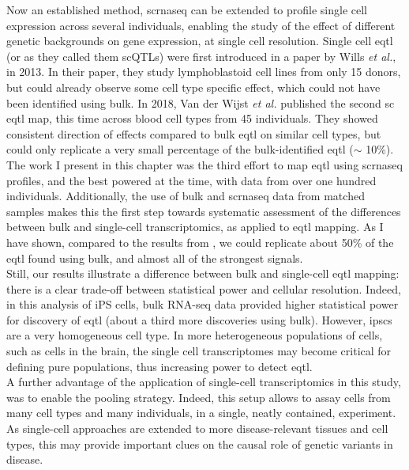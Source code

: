 Now an established method, \gls{scrnaseq} can be extended to profile single cell expression across several individuals, enabling the study of the effect of different genetic backgrounds on gene expression, at single cell resolution.
Single cell \gls{eqtl} (or as they called them scQTLs) were first introduced in a paper by Wills \textit{et al.}, in 2013.
In their paper, they study lymphoblastoid cell lines from only 15 donors, but could already observe some cell type specific effect, which could not have been identified using bulk.
In 2018, Van der Wijst \textit{et al.} \cite{van2018single} published the second sc \gls{eqtl} map, this time across blood cell types from 45 individuals.
They showed consistent direction of effects compared to bulk \gls{eqtl} on similar cell types, but could only replicate a very small percentage of the bulk-identified \gls{eqtl} ($\sim$ 10\%). \\

The work I present in this chapter was the third effort to map \gls{eqtl} using \gls{scrnaseq} profiles, and the best powered at the time, with data from over one hundred individuals.
Additionally, the use of bulk and \gls{scrnaseq} data from matched samples makes this the first step towards systematic assessment of the differences between bulk and single-cell transcriptomics, as applied to \gls{eqtl} mapping.
As I have shown, compared to the results from \cite{van2018single}, we could replicate about 50\% of the \gls{eqtl} found using bulk, and almost all of the strongest signals. \\

Still, our results illustrate a difference between bulk and single-cell \gls{eqtl} mapping: there is a clear trade-off between statistical power and cellular resolution. 
Indeed, in this analysis of iPS cells, bulk RNA-seq data provided higher statistical power for discovery of \gls{eqtl} (about a third more discoveries using bulk). 
However, \glspl{ipsc} are a very homogeneous cell type.
In more heterogeneous populations of cells, such as cells in the brain, the single cell transcriptomes may become critical for defining pure populations, thus increasing power to detect \gls{eqtl}.\\

A further advantage of the application of single-cell transcriptomics in this study, was to enable the pooling strategy. 
Indeed, this setup allows to assay cells from many cell types and many individuals, in a single, neatly contained, experiment.
As single-cell approaches are extended to more disease-relevant tissues and cell types, this may provide important clues on the causal role of genetic variants in disease. \\

